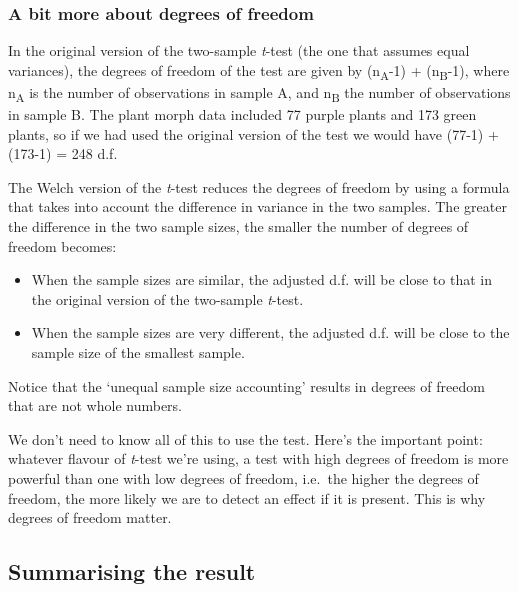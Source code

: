 \documentclass[
]{book}
\newenvironment{greybox}{
  \definecolor{shadecolor}{rgb}{0.95,0.95,0.95}  %
  \color{black}
  \begin{shaded}}
 {\end{shaded}}
\newenvironment{infobox}[1]
  {
  \begin{itemize}
  \renewcommand{\labelitemi}{
    \raisebox{-.7\height}[0pt][0pt]{
      {\setkeys{Gin}{width=3em,keepaspectratio}
        \texttt{[image: images/\#1]}}
    }
  }
  \setlength{\fboxsep}{1em}
  \begin{greybox}
  \item
  }
  {
  \end{greybox}
  \end{itemize}
  }
\begin{document}
\begin{infobox}{information}

\hypertarget{a-bit-more-about-degrees-of-freedom-1}{%
\subsubsection*{A bit more about degrees of freedom}\label{a-bit-more-about-degrees-of-freedom-1}}

In the original version of the two-sample \emph{t}-test (the one that assumes equal variances), the degrees of freedom of the test are given by (n\textsubscript{A}-1) + (n\textsubscript{B}-1), where n\textsubscript{A} is the number of observations in sample A, and n\textsubscript{B} the number of observations in sample B. The plant morph data included 77 purple plants and 173 green plants, so if we had used the original version of the test we would have (77-1) + (173-1) = 248 d.f.

The Welch version of the \emph{t}-test reduces the degrees of freedom by using a formula that takes into account the difference in variance in the two samples. The greater the difference in the two sample sizes, the smaller the number of degrees of freedom becomes:

\begin{itemize}
\item
  When the sample sizes are similar, the adjusted d.f. will be close to that in the original version of the two-sample \emph{t}-test.
\item
  When the sample sizes are very different, the adjusted d.f. will be close to the sample size of the smallest sample.
\end{itemize}

Notice that the `unequal sample size accounting' results in degrees of freedom that are not whole numbers.

We don't need to know all of this to use the test. Here's the important point: whatever flavour of \emph{t}-test we're using, a test with high degrees of freedom is more powerful than one with low degrees of freedom, i.e.~the higher the degrees of freedom, the more likely we are to detect an effect if it is present. This is why degrees of freedom matter.

\end{infobox}

\hypertarget{summarising-the-result-1}{%
\subsection{Summarising the result}\label{summarising-the-result-1}}
\end{document}
